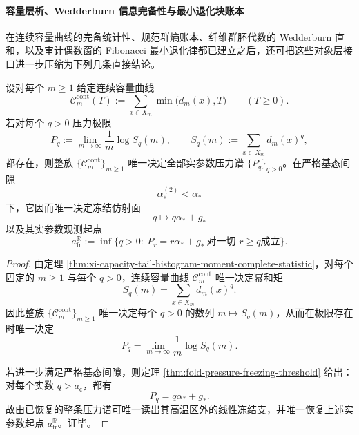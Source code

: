 \paragraph{容量层析、Wedderburn 信息完备性与最小退化块账本}
在连续容量曲线的完备统计性、规范群熵账本、纤维群胚代数的 Wedderburn 直和，以及审计偶数窗的 Fibonacci 最小退化律都已建立之后，还可把这些对象层接口进一步压缩为下列几条直接结论。

\begin{theorem}[连续容量族对实参数冻结面的层析完备性]\label{thm:xi-time-part60aaa-capacity-family-freezing-face-tomography}
设对每个 \(m\ge 1\) 给定连续容量曲线
\[
\mathcal C_m^{\mathrm{cont}}(T):=\sum_{x\in X_m}\min\bigl(d_m(x),T\bigr)
\qquad (T\ge 0).
\]
若对每个 \(q>0\) 压力极限
\[
P_q:=\lim_{m\to\infty}\frac1m\log S_q(m),
\qquad
S_q(m):=\sum_{x\in X_m}d_m(x)^q,
\]
都存在，则整族 \(\{\mathcal C_m^{\mathrm{cont}}\}_{m\ge 1}\) 唯一决定全部实参数压力谱 \(\{P_q\}_{q>0}\)。在严格基态间隙
\[
\alpha_*^{(2)}<\alpha_*
\]
下，它因而唯一决定冻结仿射面
\[
q\longmapsto q\alpha_*+g_*
\]
以及其实参数观测起点
\[
a_{\mathrm{fr}}^{\mathbb R}
:=
\inf\bigl\{
q>0:\ P_r=r\alpha_*+g_*
\ \text{对一切 }r\ge q\text{成立}
\bigr\}.
\]
\end{theorem}
\begin{proof}
由定理 \ref{thm:xi-capacity-tail-histogram-moment-complete-statistic}，对每个固定的 \(m\ge 1\) 与每个 \(q>0\)，连续容量曲线 \(\mathcal C_m^{\mathrm{cont}}\) 唯一决定幂和矩
\[
S_q(m)=\sum_{x\in X_m}d_m(x)^q.
\]
因此整族 \(\{\mathcal C_m^{\mathrm{cont}}\}_{m\ge 1}\) 唯一决定每个 \(q>0\) 的数列 \(m\mapsto S_q(m)\)，从而在极限存在时唯一决定
\[
P_q=\lim_{m\to\infty}\frac1m\log S_q(m).
\]

若进一步满足严格基态间隙，则定理 \ref{thm:fold-pressure-freezing-threshold} 给出：对每个实数 \(q>a_{\mathrm c}\)，都有
\[
P_q=q\alpha_*+g_*.
\]
故由已恢复的整条压力谱可唯一读出其高温区外的线性冻结支，并唯一恢复上述实参数起点 \(a_{\mathrm{fr}}^{\mathbb R}\)。证毕。
\end{proof}

